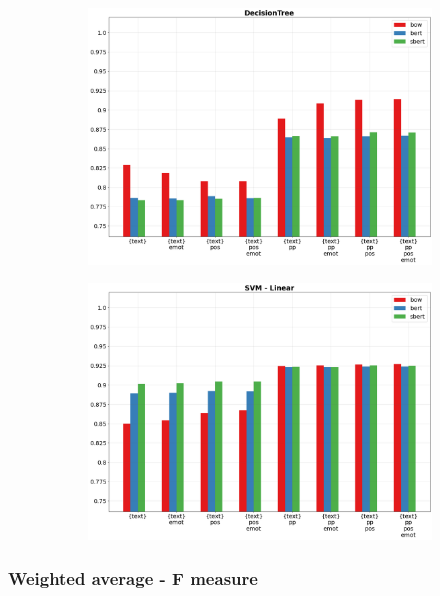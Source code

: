 \documentclass[oneside]{book}
\begin{document}
\begin{figure}[!h]
	\hspace*{-3cm}
	\begin{subfigure}[b]{0.5\textwidth}
		\centering
		\includegraphics[width=10cm]{assets/reports/text/acc/DecisionTree.png}
	\end{subfigure}
	\hfill
	\begin{subfigure}[b]{0.5\textwidth}		
		\centering
		\hspace*{0.15cm}
		\includegraphics[width=10cm]{assets/reports/text/acc/SVM - Linear.png}
	\end{subfigure}
\end{figure}
\subsubsection{Weighted average - F measure}
\end{document}
